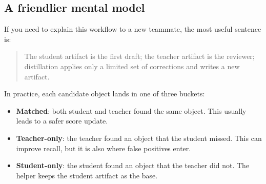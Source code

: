 \subsection{A friendlier mental model}
If you need to explain this workflow to a new teammate, the most useful sentence is:
\begin{quote}
The student artifact is the first draft; the teacher artifact is the reviewer; distillation applies only a limited set of corrections and writes a new artifact.
\end{quote}

In practice, each candidate object lands in one of three buckets:
\begin{itemize}
  \item \textbf{Matched}: both student and teacher found the same object. This usually leads to a safer score update.
  \item \textbf{Teacher-only}: the teacher found an object that the student missed. This can improve recall, but it is also where false positives enter.
  \item \textbf{Student-only}: the student found an object that the teacher did not. The helper keeps the student artifact as the base.
\end{itemize}

